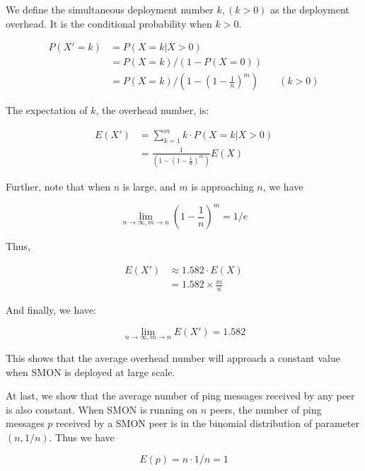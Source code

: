 We define the simultaneous deployment number $k, (k > 0)$ as
the deployment overhead. It is the conditional probability
when $k > 0$.

\begin{equation*}
\begin{aligned}
P(X' = k) &= P(X=k | X > 0) \\
&= P(X = k) / (1 - P(X = 0)) \\
&= P(X = k) / (1 - (1 - \frac{1}{n})^{m}) \qquad (k > 0)
\end{aligned}
\end{equation*}

The expectation of $k$, the overhead number, is:

\begin{equation*}
\begin{aligned}
E(X') &= \sum_{k=1}^m k \cdot P(X=k|X>0)  \\
      &= \frac{1}{(1 - (1 - \frac{1}{n})^{m})} E(X)
\end{aligned}
\end{equation*}

Further, note that when $n$ is large, and $m$ is approaching
$n$, we have

\begin{equation*}
\lim_{n \to \infty, m \to n} (1 - \frac{1}{n})^{m} = 1 / e
\end{equation*}

Thus,

\begin{equation*}
\begin{aligned}
E(X') &\approx 1.582 \cdot E(X) \\
      &= 1.582 \times \frac{m}{n}
\end{aligned}
\end{equation*}

And finally, we have:

\begin{equation*}
\lim_{n \to \infty, m \to n} E(X') = 1.582
\end{equation*}

This shows that the average overhead number will approach a
constant value when SMON is deployed at large scale.

At last, we show that the average number of ping messages
received by any peer is also constant.  When SMON is running
on $n$ peers, the number of ping messages $p$ received by a
SMON peer is in the binomial distribution of parameter $(n,
1/n)$. Thus we have

\begin{equation*}
E(p) = n \cdot 1/n = 1
\end{equation*}





